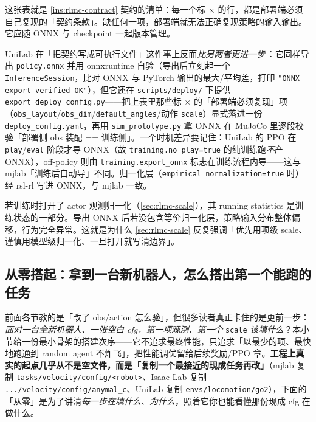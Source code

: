 这张表就是 \cref{ins:rlmc-contract} 契约的清单：每一个标 $\times$ 的行，都是部署端必须自己复现的「契约条款」。缺任何一项，部署端就无法正确复现策略的输入输出。它应随 ONNX 与 checkpoint 一起版本管理。

UniLab 在「把契约写成可执行文件」这件事上反而\emph{比另两者更进一步}\,\cite{unilab2026}：它同样导出 \verb|policy.onnx| 并用 onnxruntime 自验（导出后立刻起一个 \verb|InferenceSession|，比对 ONNX 与 PyTorch 输出的最大/平均差，打印 \verb|"ONNX export verified OK"|），但它还在 \verb|scripts/deploy/| 下提供 \verb|export_deploy_config.py|——把上表里那些标 $\times$ 的「部署端必须复现」项（\verb|obs_layout|/\verb|obs_dim|/\verb|default_angles|/动作 \verb|scale|）显式落进一份 \verb|deploy_config.yaml|，再用 \verb|sim_prototype.py| 拿 ONNX 在 MuJoCo 里逐段校验「部署侧 obs 装配 == 训练侧」。一个时机差异要记住：UniLab 的 PPO 在 \verb|play|/\verb|eval| 阶段才导 ONNX（故 \verb|training.no_play=true| 的纯训练跑\emph{不}产 ONNX），off-policy 则由 \verb|training.export_onnx| 标志在训练流程内导——这与 mjlab「训练后自动导」不同。归一化层（\verb|empirical_normalization=true| 时）经 rsl-rl 写进 ONNX，与 mjlab 一致。

\begin{pitfall}
若训练时打开了 actor 观测归一化（\cref{sec:rlmc-scale}），其 running statistics 是训练状态的一部分。导出 ONNX 后若没包含等价归一化层，策略输入分布整体偏移，行为完全异常。这就是为什么 \cref{sec:rlmc-scale} 反复强调「优先用项级 scale、谨慎用模型级归一化、一旦打开就写清边界」。
\end{pitfall}

\subsection{从零搭起：拿到一台新机器人，怎么搭出第一个能跑的任务}
\label{sec:rlmc-fromzero}

前面各节教的是「改了 obs/action 怎么验」，但很多读者真正卡住的是更前一步：\emph{面对一台全新机器人、一张空白 cfg，第一项观测、第一个} \verb|scale| \emph{该填什么}？本小节给一份最小骨架的搭建次序——它不追求最终性能，只追求「以最少的项、最快地跑通到 random agent 不炸飞」，把性能调优留给后续奖励/PPO 章。\textbf{工程上真实的起点几乎从不是空文件，而是「复制一个最接近的现成任务再改」}（mjlab 复制 \verb|tasks/velocity/config/<robot>|、Isaac Lab 复制 \verb|.../velocity/config/anymal_c|、UniLab 复制 \verb|envs/locomotion/go2|），下面的「从零」是为了讲清\emph{每一步在填什么、为什么}，照着它你也能看懂那份现成 cfg 在做什么。


